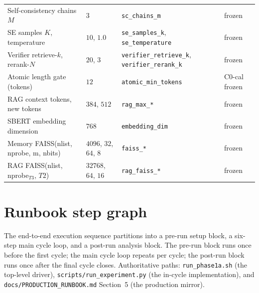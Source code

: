 {\begin{longtable}{@{}p{4.0cm}p{3.8cm}p{4.0cm}p{2.6cm}@{}}
Self-consistency chains $M$          & $3$ & \texttt{sc\_chains\_m} & frozen \\
SE samples $K$, temperature          & $10$, $1.0$ & \texttt{se\_samples\_k},\allowbreak{} \texttt{se\_temperature} & frozen \\
Verifier retrieve-$k$, rerank-$N$    & $20$, $3$ & \texttt{verifier\_retrieve\_k},\allowbreak{} \texttt{verifier\_rerank\_k} & frozen \\
Atomic length gate (tokens)          & $12$ & \texttt{atomic\_min\_tokens} & C0-cal frozen \\
RAG context tokens, new tokens       & $384$, $512$ & \texttt{rag\_max\_*} & frozen \\
SBERT embedding dimension            & $768$ & \texttt{embedding\_dim} & frozen \\
Memory FAISS\newline (nlist, nprobe, m, nbits) & $4096$, $32$, $64$, $8$ & \texttt{faiss\_*} & frozen \\
RAG FAISS\newline (nlist, nprobe$_{T3}$, $T2$) & $32768$, $64$, $16$ & \texttt{rag\_faiss\_*} & frozen \\
\end{longtable}
}

\section{Runbook step graph}
\label{app:runbook}

The end-to-end execution sequence partitions into a pre-run setup block, a six-step main cycle loop, and a post-run analysis block. The pre-run block runs once before the first cycle; the main cycle loop repeats per cycle; the post-run block runs once after the final cycle closes. Authoritative paths: \verb|run_phase1a.sh| (the top-level driver), \verb|scripts/run_experiment.py| (the in-cycle implementation), and \verb|docs/PRODUCTION_RUNBOOK.md| Section~5 (the production mirror).

